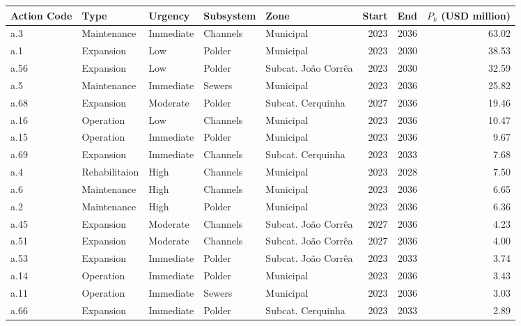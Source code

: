 \documentclass[12pt]{article}
\begin{document}
\begin{table}[t]
    \centering
    \tiny
\begin{tabular}{lllllrrr}
\toprule
\textbf{Action Code} &          \textbf{Type}&   \textbf{Urgency} &   \textbf{Subsystem} &                \textbf{Zone} &  \textbf{Start} &  \textbf{End} &    \textbf{$P_k$ (USD million)} \\
\midrule
 a.3 &   Maintenance & Immediate & Channels &           Municipal &   2023 & 2036 & 63.02 \\
 a.1 &     Expansion &       Low &   Polder &           Municipal &   2023 & 2030 & 38.53 \\
a.56 &     Expansion &       Low &   Polder & Subcat. João Corrêa &   2023 & 2030 & 32.59 \\
 a.5 &   Maintenance & Immediate &   Sewers &           Municipal &   2023 & 2036 & 25.82 \\
a.68 &     Expansion &  Moderate &   Polder &   Subcat. Cerquinha &   2027 & 2036 & 19.46 \\
a.16 &     Operation &       Low & Channels &           Municipal &   2023 & 2036 & 10.47 \\
a.15 &     Operation & Immediate &   Polder &           Municipal &   2023 & 2036 &  9.67 \\
a.69 &     Expansion & Immediate & Channels &   Subcat. Cerquinha &   2023 & 2033 &  7.68 \\
 a.4 & Rehabilitaion &      High & Channels &           Municipal &   2023 & 2028 &  7.50 \\
 a.6 &   Maintenance &      High & Channels &           Municipal &   2023 & 2036 &  6.65 \\
 a.2 &   Maintenance &      High &   Polder &           Municipal &   2023 & 2036 &  6.36 \\
a.45 &     Expansion &  Moderate & Channels & Subcat. João Corrêa &   2027 & 2036 &  4.23 \\
a.51 &     Expansion &  Moderate & Channels & Subcat. João Corrêa &   2027 & 2036 &  4.00 \\
a.53 &     Expansion & Immediate &   Polder & Subcat. João Corrêa &   2023 & 2033 &  3.74 \\
a.14 &     Operation & Immediate &   Polder &           Municipal &   2023 & 2036 &  3.43 \\
a.11 &     Operation & Immediate &   Sewers &           Municipal &   2023 & 2036 &  3.03 \\
a.66 &     Expansion & Immediate &   Polder &   Subcat. Cerquinha &   2023 & 2033 &  2.89 \\

\end{tabular}
\end{table}
\end{document}
